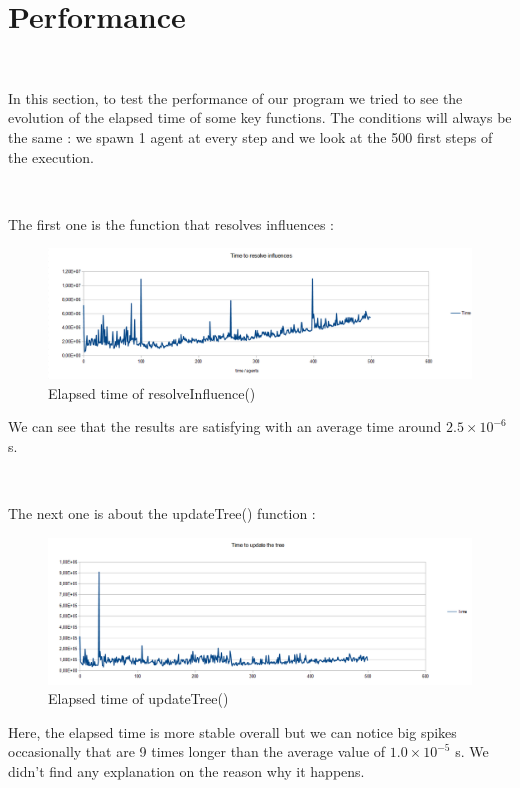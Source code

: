 \documentclass[a4paper,10pt]{book}
\begin{document}
\section {Performance}

~

In this section, to test the performance of our program we tried to see the evolution of the elapsed time of some key functions. The conditions will always be the same : we spawn 1 agent at every step and we look at the 500 first steps of the execution.

~

The first one is the function that resolves influences :

\begin{figure}[h]
 \centering
 \includegraphics[scale=0.5]{resolveInfluence}
 \caption{Elapsed time of resolveInfluence()}
\end{figure}

We can see that the results are satisfying with an average time around $2.5\times10^{-6}$ s.

~

The next one is about the updateTree() function :

\begin{figure}[h]
 \includegraphics[scale=0.5]{updateTree}
 \caption{Elapsed time of updateTree()}
\end{figure}
Here, the elapsed time is more stable overall but we can notice big spikes occasionally that are 9 times longer than the average value of $1.0\times10^{-5}$ s. We didn't find any explanation on the reason why it happens.

\newpage
\end{document}
